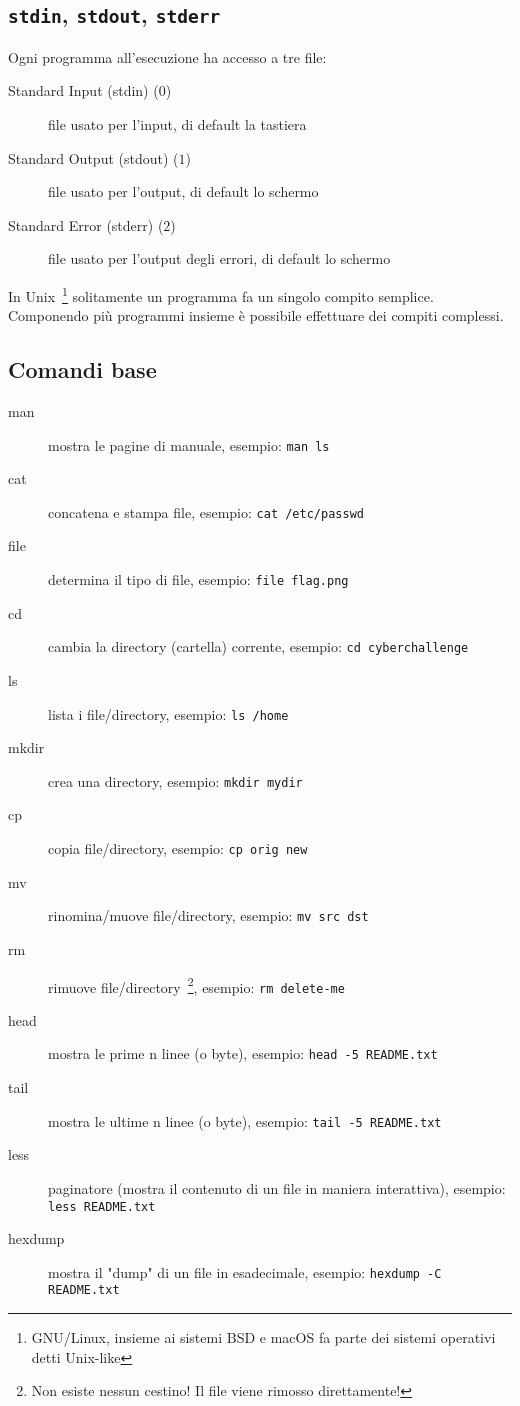 \documentclass{beamer}
\newcommand{\command}[1]{\mbox{\texttt{#1}}}
\newcommand{\file}[1]{\mbox{\texttt{#1}}}
\begin{document}
\subsection*{\file{stdin}, \file{stdout}, \file{stderr}}
\begin{frame}{\insertsubsection}
Ogni programma all'esecuzione ha accesso a tre \alert{file}:
\begin{description}
\item[Standard Input (stdin) ($0$)] file usato per l'input, di default la
tastiera
\item[Standard Output (stdout) ($1$)] file usato per l'output, di default lo
schermo
\item[Standard Error (stderr) ($2$)] file usato per l'output degli errori, di
default lo schermo
\end{description}
In Unix~\footnote{GNU/Linux, insieme ai sistemi BSD e macOS fa parte
dei sistemi operativi detti Unix-like} solitamente un programma fa un
singolo compito semplice. Componendo più programmi insieme è possibile
effettuare dei compiti complessi.
\end{frame}

\subsection*{Comandi base}
\begin{frame}[allowframebreaks]{\insertsubsection}
\begin{description}
\item[man] mostra le pagine di manuale, esempio: \command{man ls}
\item[cat] concatena e stampa file, esempio: \command{cat /etc/passwd}
\item[file] determina il tipo di file, esempio: \command{file flag.png}
\item[cd] cambia la directory (cartella) corrente, esempio: \command{cd cyberchallenge}
\item[ls] lista i file/directory, esempio: \command{ls /home}
\item[mkdir] crea una directory, esempio: \command{mkdir mydir}
\item[cp] copia file/directory, esempio: \command{cp orig new}
\item[mv] rinomina/muove file/directory, esempio: \command{mv src dst}
\item[rm] rimuove file/directory~\footnote{Non esiste nessun cestino! Il file viene
rimosso direttamente!}, esempio: \command{rm delete-me}
\item[head] mostra le prime n linee (o byte), esempio: \command{head -5 README.txt}
\item[tail] mostra le ultime n linee (o byte), esempio: \command{tail -5 README.txt}
\item[less] paginatore (mostra il contenuto di un file in maniera interattiva), esempio: \command{less README.txt}
\item[hexdump] mostra il "dump" di un file in esadecimale, esempio: \command{hexdump -C README.txt}
\end{description}
\end{frame}
\end{document}
